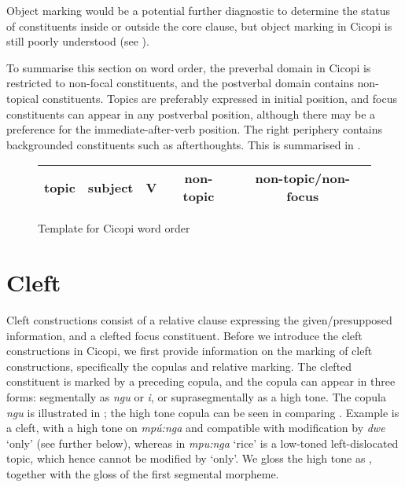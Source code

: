 \documentclass[output=paper]{langscibook}
\begin{document}
\z
\z

Object marking would be a potential further diagnostic to determine the status of constituents inside or outside the core clause, but object marking in Cicopi is still poorly understood (see ).

To summarise this section on word order, the preverbal domain in Cicopi is restricted to non-focal constituents, and the postverbal domain contains non-topical constituents. Topics are preferably expressed in initial position, and focus constituents can appear in any postverbal position, although there may be a preference for the immediate-after-verb position. The right periphery contains backgrounded constituents such as afterthoughts. This is summarised in . 

\begin{figure}
\begin{tabular}{|c|c|c|c|c|}
\hline
topic & subject & V & non-topic & non-topic/non-focus\\
\hline
\end{tabular}
\caption{Template for Cicopi word order}
\label{fig:cicopiwo}
\end{figure}

\section{Cleft}
\label{bkm:Ref121993097}
Cleft constructions consist of a relative clause expressing the given/presupposed information, and a clefted focus constituent. Before we introduce the cleft constructions in Cicopi, we first provide information on the marking of cleft constructions, specifically the copulas and relative marking. The clefted constituent is marked by a preceding copula, and the copula can appear in three forms: segmentally as \textit{ngu} or \textit{i}, or suprasegmentally as a high tone. The copula \textit{ngu} is illustrated in ; the high tone copula can be seen in comparing . Example  is a cleft, with a high tone on \textit{mpú:nga} and compatible with modification by \textit{dwe} ‘only’ (see further below), whereas in  \textit{mpu:nga} `rice' is a low-toned left-dislocated topic, which hence cannot be modified by ‘only’. We gloss the high tone as \COP{}, together with the gloss of the first segmental morpheme.
\end{document}
